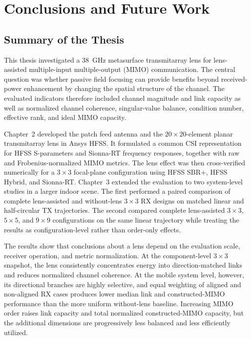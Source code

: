 \chapter{Conclusions and Future Work}

\section{Summary of the Thesis}

This thesis investigated a 38~GHz metasurface transmitarray lens for lens-assisted multiple-input multiple-output (MIMO) communication. The central question was whether passive field focusing can provide benefits beyond received-power enhancement by changing the spatial structure of the channel. The evaluated indicators therefore included channel magnitude and link capacity as well as normalized channel coherence, singular-value balance, condition number, effective rank, and ideal MIMO capacity.

Chapter~2 developed the patch feed antenna and the $20\times20$-element planar transmitarray lens in Ansys HFSS. It formulated a common CSI representation for HFSS S-parameters and Sionna-RT frequency responses, together with raw and Frobenius-normalized MIMO metrics. The lens effect was then cross-verified numerically for a $3\times3$ focal-plane configuration using HFSS SBR+, HFSS Hybrid, and Sionna-RT. Chapter~3 extended the evaluation to two system-level studies in a larger indoor scene. The first performed a paired comparison of complete lens-assisted and without-lens $3\times3$ RX designs on matched linear and half-circular TX trajectories. The second compared complete lens-assisted $3\times3$, $5\times5$, and $9\times9$ configurations on the same linear trajectory while treating the results as configuration-level rather than order-only effects.

The results show that conclusions about a lens depend on the evaluation scale, receiver operation, and metric normalization. At the component-level $3\times3$ snapshot, the lens consistently concentrates energy into direction-matched links and reduces normalized channel coherence. At the mobile system level, however, its directional branches are highly selective, and equal weighting of aligned and non-aligned RX cases produces lower median link and constructed-MIMO performance than the more uniform without-lens baseline. Increasing MIMO order raises link capacity and total normalized constructed-MIMO capacity, but the additional dimensions are progressively less balanced and less efficiently utilized.

